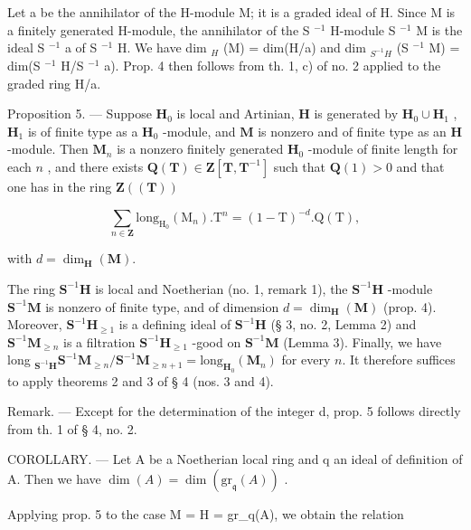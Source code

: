 Let a be the annihilator of the H-module M; it is a graded ideal of H. Since M is a finitely generated H-module, the annihilator of the S \(^{-1}\) H-module S \(^{-1}\) M is the ideal S \(^{-1}\) a of S \(^{-1}\) H. We have dim \(_{H}\) (M) = dim(H/a) and dim \(_{S^{-1}H}\) (S \(^{-1}\) M) = dim(S \(^{-1}\) H/S \(^{-1}\) a). Prop. 4 then follows from th. 1, c) of no. 2 applied to the graded ring H/a.

Proposition 5. — Suppose \(\mathbf{H}_{0}\) is local and Artinian, \(\mathbf{H}\) is generated by \(\mathbf{H}_{0} \cup \mathbf{H}_{1}\) , \(\mathbf{H}_{1}\) is of finite type as a \(\mathbf{H}_{0}\) -module, and \(\mathbf{M}\) is nonzero and of finite type as an \(\mathbf{H}\) -module. Then \(\mathbf{M}_{n}\) is a nonzero finitely generated \(\mathbf{H}_{0}\) -module of finite length for each \(n\) , and there exists \(\mathbf{Q}(\mathbf{T}) \in \mathbf{Z}[\mathbf{T}, \mathbf{T}^{-1}]\) such that \(\mathbf{Q}(1) > 0\) and that one has in the ring \(\mathbf{Z}((\mathbf{T}))\)

\[
\sum_ {n \in \mathbf {Z}} \mathrm{long} _ {\mathrm{H} _ {0}} (\mathrm{M} _ {n}). \mathrm{T} ^ {n} = (1 - \mathrm{T}) ^ {- d}. \mathrm{Q} (\mathrm{T}),
\]

with \(d = \dim_{\mathbf{H}}(\mathbf{M})\).

The ring \(\mathbf{S}^{-1}\mathbf{H}\) is local and Noetherian (no. 1, remark 1), the \(\mathbf{S}^{-1}\mathbf{H}\) -module \(\mathbf{S}^{-1}\mathbf{M}\) is nonzero of finite type, and of dimension \(d = \dim_{\mathbf{H}}(\mathbf{M})\) (prop. 4). Moreover, \(\mathbf{S}^{-1}\mathbf{H}_{\geqslant 1}\) is a defining ideal of \(\mathbf{S}^{-1}\mathbf{H}\) (§ 3, no. 2, Lemma 2) and \(\mathbf{S}^{-1}\mathbf{M}_{\geqslant n}\) is a filtration \(\mathbf{S}^{-1}\mathbf{H}_{\geqslant 1}\) -good on \(\mathbf{S}^{-1}\mathbf{M}\) (Lemma 3). Finally, we have long \(_{\mathbf{S}^{-1}\mathbf{H}}\mathbf{S}^{-1}\mathbf{M}_{\geqslant n}/\mathbf{S}^{-1}\mathbf{M}_{\geqslant n+1} = \text{long}_{\mathbf{H}_0}(\mathbf{M}_n)\) for every \(n\). It therefore suffices to apply theorems 2 and 3 of § 4 (nos. 3 and 4).

Remark. --- Except for the determination of the integer d, prop. 5 follows directly from th. 1 of § 4, no. 2.

COROLLARY. --- Let A be a Noetherian local ring and q an ideal of definition of A. Then we have \(\dim(A) = \dim(\text{gr}_{\mathfrak{q}}(A))\) .

Applying prop. 5 to the case M = H = gr\_q(A), we obtain the relation

